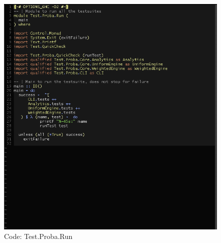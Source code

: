 \documentclass[12pt,a4paper,titlepage]{article}
\begin{document}
\begin{figure}[h!]
\centering
\includegraphics[width=1\textwidth]{img/code-test-run.png}
\caption{Code: Test.Proba.Run}
\label{fig:test.run}
\end{figure}
\end{document}
